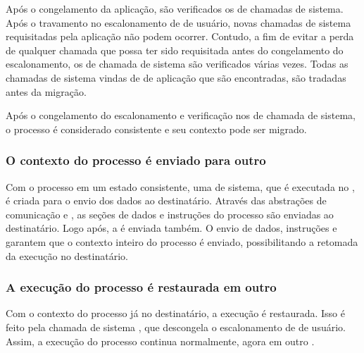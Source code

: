    Após o congelamento da aplicação, são verificados os \buffers de chamadas de sistema. Após o travamento no escalonamento de \threads de usuário, novas chamadas de sistema requisitadas pela aplicação não podem ocorrer. Contudo, a fim de evitar a perda de qualquer chamada que possa ter sido requisitada antes do congelamento do escalonamento, os \buffers de chamada de sistema são verificados várias vezes. Todas as chamadas de sistema vindas de \threads de aplicação que são encontradas, são tradadas antes da migração.

    Após o congelamento do escalonamento e verificação nos \buffers de chamada de sistema, o processo é considerado consistente e seu contexto pode ser migrado.

\subsubsection{O contexto do processo é enviado para outro \cluster}

    Com o processo em um estado consistente, uma \task de sistema, que é executada no \mcore, é criada para o envio dos dados ao \cluster destinatário. Através das abstrações de comunicação \mailbox e \portal, as seções de dados e instruções do processo são enviadas ao \cluster destinatário. Logo após, a \uarea é enviada também. O envio de dados, instruções e \uarea garantem que o contexto inteiro do processo é enviado, possibilitando a retomada da execução no \cluster destinatário.


\subsubsection{A execução do processo é restaurada em outro \cluster}
    Com o contexto do processo já no \cluster destinatário, a execução é restaurada. Isso é feito pela chamada de sistema \unfreeze, que descongela o escalonamento de \threads de usuário. Assim, a execução do processo continua normalmente, agora em outro \cluster.





